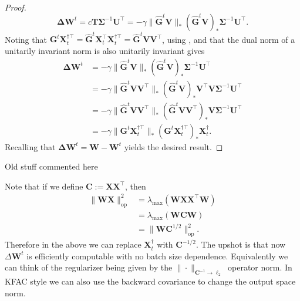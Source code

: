 \documentclass[11pt]{article}
\newcommand{\mat}[1]{\bm{#1}}
\newcommand{\norm}[1]{\| #1\|}
\newcommand{\mG}{\mat{ G}}
\newcommand{\mX}{\mat{ X}}
\newcommand{\mC}{\mat{ C}}
\newcommand{\mW}{\mat{ W}}
\newcommand{\DW}{\mat{ \Delta W}}
\newcommand{\mT}{\mat{ T}}
\newcommand{\mU}{\mat{ U}}
\newcommand{\mV}{\mat{ V}}
\newcommand{\David}[1]{{\color{blue}{\textbf{David:}} #1}}
\newcommand{\nikhil}[1]{{\color{purple}{\textbf{Nikhil:}} #1}}
\begin{document}
\begin{proof}
\begin{equation*}
    \DW^t = c\mT \bm{\Sigma}^{-1} \mU^{\top} = -\gamma \|\hat{\mG}^t \mV\|_*(\hat{\mG}^t \mV)_*\bm{\Sigma}^{-1} \bm{U}^{\top}.
\end{equation*}
Noting that $\mG^t \mX_t^{\dagger \top} = \hat{\mG}^t \mX_t^{\top} \mX_t^{\dagger \top} = \hat{\mG}^t \mV\mV^{\top}$, using , and that the dual norm of a unitarily invariant norm is also unitarily invariant \cite[p.96]{bhatia} gives
\begin{align*}
    \DW^t &= -\gamma \|\hat{\mG}^t \mV\|_*(\hat{\mG}^t \mV)_*\bm{\Sigma}^{-1} \bm{U}^{\top}\\
    &=-\gamma \|\hat{\mG}^t \mV\mV^{\top}\|_* (\hat{\mG}^t \mV)_* \mV^{\top} \mV \bm{\Sigma}^{-1} \bm{U}^{\top}\\
    &=-\gamma \|\hat{\mG}^t \mV\mV^{\top}\|_* (\hat{\mG}^t \mV\mV^{\top})_* \mV \bm{\Sigma}^{-1} \bm{U}^{\top}\\
    &=- \gamma  \|\mG^t \mX_t^{\dagger \top}\|_*(\mG^t \mX_t^{\dagger \top})_* \mX_t^{\dagger}.
\end{align*}
Recalling that $\DW^{t} = \mW - \mW^t$ yields the desired result.
\end{proof}

\David{Old stuff commented here}

\nikhil{Note that if we define $\mC := \mX \mX^\top$, then
\begin{align*}
    \norm{\mW \mX}_{\mathrm{op}}^2 &= \lambda_{\max}(\mW \mX \mX^\top \mW)\\ 
    &= \lambda_{\max}(\mW \mC \mW)\\ 
    &= \norm{\mW \mC^{1/2}}_{\mathrm{op}}^2.
\end{align*}
Therefore in the above we can replace $\mX_t^{\dagger}$ with $\mC^{-1/2}$. The upshot is that now $\Delta \mW^t$ is efficiently computable with no batch size dependence. Equivalently we can think of the regularizer being given by the $\norm{\cdot}_{\mC^{-1} \to \ell_2}$ operator norm. In KFAC style we can also use the backward covariance to change the output space norm.
}
\end{document}
